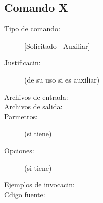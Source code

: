 \documentclass[12pt]{article}
\begin{document}
\subsection{Comando X}
\begin{description}
	\item [Tipo de comando:] [Solicitado | Auxiliar]
	
	\item [Justificacin:] (de su uso si es auxiliar)
	
	\item [Archivos de entrada:]
	
	\item [Archivos de salida:]
	
	\item [Parmetros:] (si tiene)
	
	\item [Opciones:] (si tiene)
	
	\item [Ejemplos de invocacin:]
	
	\item [Cdigo fuente:]
\end{description}
{\footnotesize
%
}
%     
\end{document}
